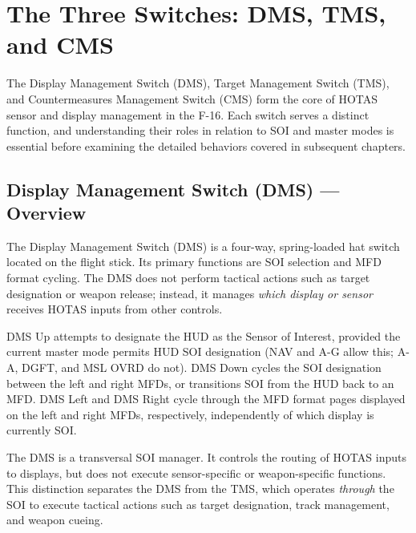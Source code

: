 \documentclass[11pt, a4paper, twoside]{report}
\begin{document}

\section{The Three Switches: DMS, TMS, and CMS}
\label{sec:C2-S3}

The Display Management Switch (DMS), Target Management Switch (TMS), and Countermeasures Management Switch (CMS) form the core of HOTAS sensor and display management in the F-16. Each switch serves a distinct function, and understanding their roles in relation to SOI and master modes is essential before examining the detailed behaviors covered in subsequent chapters.


\subsection{Display Management Switch (DMS) — Overview}
\label{sec:C2-S3-S1}

The Display Management Switch (DMS) is a four-way, spring-loaded hat switch located on the flight stick. Its primary functions are SOI selection and MFD format cycling. The DMS does not perform tactical actions such as target designation or weapon release; instead, it manages \textit{which display or sensor} receives HOTAS inputs from other controls.

DMS Up attempts to designate the HUD as the Sensor of Interest, provided the current master mode permits HUD SOI designation (NAV and A-G allow this; A-A, DGFT, and MSL OVRD do not). DMS Down cycles the SOI designation between the left and right MFDs, or transitions SOI from the HUD back to an MFD. DMS Left and DMS Right cycle through the MFD format pages displayed on the left and right MFDs, respectively, independently of which display is currently SOI.

The DMS is a transversal SOI manager. It controls the routing of HOTAS inputs to displays, but does not execute sensor-specific or weapon-specific functions. This distinction separates the DMS from the TMS, which operates \textit{through} the SOI to execute tactical actions such as target designation, track management, and weapon cueing.
\end{document}
